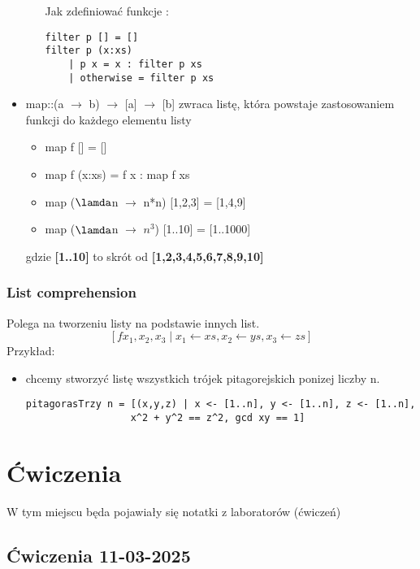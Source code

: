 \documentclass[11pt,a4paper]{article}
\begin{document}
\begin{itemize}
\begin{itemize}
                Jak zdefiniować funkcje :
                \begin{Verbatim}[frame=single]
filter p [] = []
filter p (x:xs)
    | p x = x : filter p xs
    | otherwise = filter p xs
                \end{Verbatim}
        \end{itemize}
    \item map::(a $\rightarrow$ b) $\rightarrow$ [a] $\rightarrow$ [b] \newline
        zwraca listę, która powstaje zastosowaniem funkcji do każdego elementu listy
        \begin{itemize}
            \item map f [] = []
            \item map f (x:xs) = f x : map f xs
            \item map ($\lamda$n $\rightarrow$ n*n) [1,2,3] = [1,4,9]
            \item map ($\lamda$n $\rightarrow$ $n^3$) [1..10] = [1..1000]
        \end{itemize}
        gdzie \textbf{[1..10]} to skrót od \textbf{[1,2,3,4,5,6,7,8,9,10]}
\end{itemize}

\subsubsection{List comprehension}
Polega na tworzeniu listy na podstawie innych list.
\[
    \boxed{[f x_1, x_2, x_3 \mid x_1 \leftarrow xs, x_2 \leftarrow ys, x_3 \leftarrow zs]}
\]
Przykład:
\begin{itemize}
    \item chcemy stworzyć listę wszystkich trójek pitagorejskich ponizej liczby n.
        \begin{Verbatim}[frame=single]
pitagorasTrzy n = [(x,y,z) | x <- [1..n], y <- [1..n], z <- [1..n],
                  x^2 + y^2 == z^2, gcd xy == 1]
        \end{Verbatim}
\end{itemize}



\section{Ćwiczenia}
W tym miejscu będa pojawiały się notatki z laboratorów (ćwiczeń)
\subsection{Ćwiczenia 11-03-2025}
\end{document}
